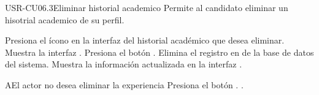 \begin{UseCase}[]{USR-CU06.3}{Eliminar historial academico}{
	Permite al candidato eliminar un hisotrial academico de su perfil.
}
\end{UseCase}

\begin{UCtrayectoria}
	\UCpaso [\UCactor] Presiona el ícono \IUEliminar{} en la interfaz  del historial académico que desea eliminar.
	\UCpaso Muestra la interfaz .
	\UCpaso [\UCsist] Presiona el botón .
	\UCpaso Elimina el registro en de la base de datos del sistema.
	\UCpaso Muestra la información actualizada en la interfaz . 
\end{UCtrayectoria}

\begin{UCtrayectoriaA}{A}{El actor no desea eliminar la experiencia}
	\UCpaso [\UCsist] Presiona el botón .
	.
\end{UCtrayectoriaA} 
